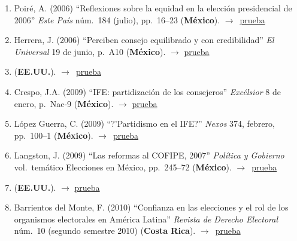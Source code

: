 \documentclass[12 pt, letter]{article}
\newenvironment{CitasMiTrabajo}{
    \begin{footnotesize}
    \begin{enumerate}[label={\footnotesize\emph{cita~\arabic*}},ref=\arabic*] %
        \setlength{\itemsep}{.1\itemsep}
        \setlength{\parskip}{.1\parskip}
    }{\end{enumerate}\end{footnotesize}}
\begin{document}
        \begin{CitasMiTrabajo}

        \item Poir\'e, A. (2006)
        ``Reflexiones sobre la equidad en la
        elecci\'on presidencial de 2006'' \emph{Este Pa\'is} n\'um.\ 184
        (julio), pp.\ 16--23  (\textbf{M\'exico}). $\rightarrow$~\href{http://ericmagar.com/cv/cites/estevezEtalElecStud/poire.pdf}{prueba}

        \item Herrera, J. (2006)
        ``Perciben consejo equilibrado y con
        credibilidad'' \emph{El Universal} 19 de junio, p.\ A10  (\textbf{M\'exico}). $\rightarrow$ \href{http://ericmagar.com/cv/cites/estevezEtalElecStud/univ.pdf}{prueba}

        \item {} (\textbf{EE.UU.}). $\rightarrow$~\href{http://ericmagar.com/cv/cites/estevezEtalElecStud/eisen.pdf}{prueba}

        \item Crespo, J.A. (2009)
        ``IFE: partidizaci\'on de los consejeros''
        \emph{Exc\'elsior} 8 de enero, p.\ Nac-9 (\textbf{M\'exico}). $\rightarrow$ \href{http://ericmagar.com/cv/cites/estevezEtalElecStud/crespo.pdf}{prueba}

        \item L\'opez Guerra, C. (2009)
        ``?'Partidismo en el IFE?''
        \emph{Nexos} 374, febrero, pp.\ 100--1 (\textbf{M\'exico}). $\rightarrow$~\href{http://ericmagar.com/cv/cites/estevezEtalElecStud/lg.pdf}{prueba}

        \item Langston, J. (2009) ``Las reformas al COFIPE, 2007''
            \emph{Pol\'itica y Gobierno}
            vol.\ tem\'atico Elecciones en M\'exico, pp.\ 245--72 (\textbf{M\'exico}). $\rightarrow$~\href{http://ericmagar.com/cv/cites/estevezEtalElecStud/langstonRefCofipe2009pyg.excerpt.pdf}{prueba}
            
        \item {} (\textbf{EE.UU.}).  $\rightarrow$ \href{http://ericmagar.com/cv/cites/estevezEtalElecStud/bumin2009phd.pdf}{prueba}

        \item Barrientos del Monte, F. (2010) ``Confianza en las elecciones y el rol de los organismos electorales en Am\'erica Latina'' \emph{Revista de Derecho Electoral} n\'um.\ 10 (segundo semestre 2010) (\textbf{Costa Rica}). $\rightarrow$~\href{http://ericmagar.com/cv/cites/estevezEtalElecStud/Barrientos.pdf}{prueba}


\end{CitasMiTrabajo}
\end{document}

